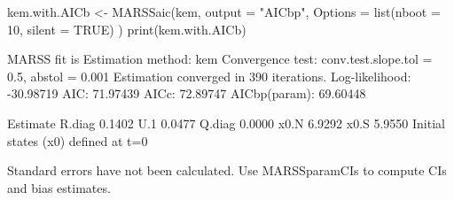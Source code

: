 \begin{Schunk}
\begin{Sinput}
 kem.with.AICb <- MARSSaic(kem,
   output = "AICbp",
   Options = list(nboot = 10, silent = TRUE)
 )
 print(kem.with.AICb)
\end{Sinput}
\begin{Soutput}
MARSS fit is
Estimation method: kem 
Convergence test: conv.test.slope.tol = 0.5, abstol = 0.001
Estimation converged in 390 iterations. 
Log-likelihood: -30.98719 
AIC: 71.97439   AICc: 72.89747   AICbp(param): 69.60448   
 
       Estimate
R.diag   0.1402
U.1      0.0477
Q.diag   0.0000
x0.N     6.9292
x0.S     5.9550
Initial states (x0) defined at t=0

Standard errors have not been calculated. 
Use MARSSparamCIs to compute CIs and bias estimates.
\end{Soutput}
\end{Schunk}

